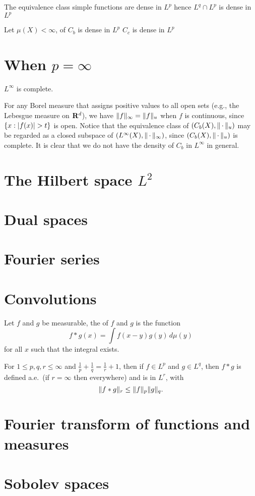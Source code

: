 \begin{prop}
    The equivalence class simple functions are dense in $L^p$ hence $L^q \cap L^p$ is dense in $L^p$
    
    Let $\mu(X)<\infty$, of $C_b$ is dense in $L^p$
    $C_c$ is dense in $L^p$
\end{prop}

\section{When \texorpdfstring{$p = \infty$}{p = infty}}
\begin{thm}
    $L^\infty$ is complete.
\end{thm}

For any Borel measure that assigns positive values to all open sets (e.g., the Lebesgue measure on $\mathbf{R}^d$), we have $\lVert f \rVert_{\infty} = \lVert f \rVert_u$ when $f$ is continuous, since $\{x:\lvert f(x) \rvert > t\}$ is open. Notice that the equivalence class of $(C_b(X),\lVert \,\cdot\, \rVert_u)$ may be regarded as a closed subspace of $(L^\infty(X),\lVert \,\cdot\, \rVert_\infty)$, since $(C_b(X),\lVert \,\cdot\, \rVert_u)$ is complete. It is clear that we do not have the density of $C_b$ in $L^\infty$ in general.

\section{The Hilbert space \texorpdfstring{$L^2$}{L2}}

\section{Dual spaces}

\section{Fourier series}

\section{Convolutions}
Let $f$ and $g$ be measurable, the  of $f$ and $g$ is the function \[
    f * g(x) = \int f(x - y)g(y)\,d\mu(y)
\] for all $x$ such that the integral exists.

\begin{namedthm}
    For $1 \leq p,q,r\leq \infty$ and $\frac{1}{p} + \frac{1}{q} = \frac{1}{r} + 1$, then if $f \in L^p$ and $g \in L^q$, then $f * g$ is defined a.e.\ (if $r = \infty$ then everywhere) and is in $L^r$, with \[
        \lVert f * g \rVert_{r} \leq \lVert f \rVert_p\lVert g \rVert_q.
    \]
\end{namedthm}

\section{Fourier transform of functions and measures}

\section{Sobolev spaces}